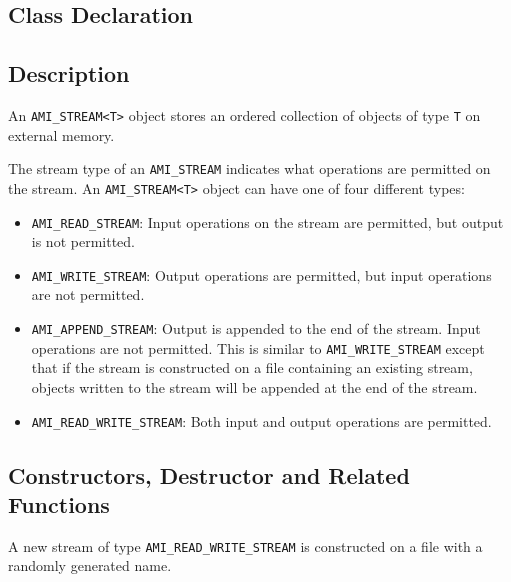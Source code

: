 \subsection{Class Declaration}
  \btabb
     {}
  \etabb

\subsection{Description}
An \lstinline|AMI_STREAM<T>| object stores an ordered collection of objects of
type \lstinline|T| on external memory.

The stream type of an \lstinline|AMI_STREAM| indicates what
operations are permitted on the stream.
An \lstinline|AMI_STREAM<T>| object can have one of four different types:
\begin{itemize}
    
    \item \lstinline|AMI_READ_STREAM|: Input operations on
    the stream are permitted, but output is not permitted.
    
    \item \lstinline|AMI_WRITE_STREAM|: Output operations are
    permitted, but input operations are not permitted. 
    
    \item \lstinline|AMI_APPEND_STREAM|: Output is appended
    to the end of the stream. Input operations are not
    permitted. This is similar to
    \lstinline|AMI_WRITE_STREAM| except that if the stream is
    constructed on a file containing an existing stream,
    objects written to the stream will be appended at the
    end of the stream.

    \item \lstinline|AMI_READ_WRITE_STREAM|: Both input and output
    operations are permitted.
\end{itemize}

\clearpage

\subsection{Constructors, Destructor and Related Functions}
  \btabb

     {A new stream of type
    \lstinline|AMI_READ_WRITE_STREAM| is constructed on a file with a
    randomly generated name.}
 

